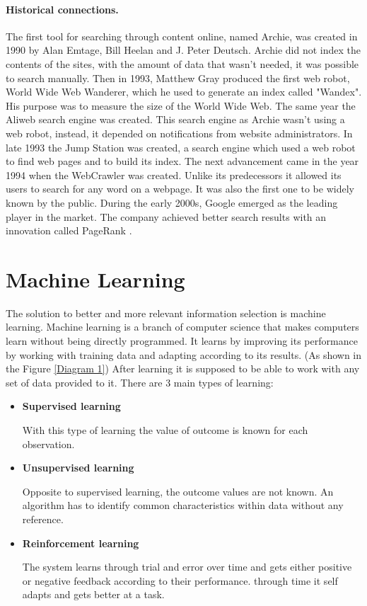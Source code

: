\documentclass[10pt,a4paper]{article}
\begin{document}
\paragraph{Historical connections.}
The first tool\cite{History} for searching through content online, named Archie, was created in 1990 by Alan Emtage, Bill Heelan and J. Peter Deutsch. Archie did not index the contents of the sites, with the amount of data that wasn't needed, it was possible to search manually. Then in 1993, Matthew Gray produced the first web robot, World Wide Web Wanderer, which he used to generate an index called "Wandex". His purpose was to measure the size of the World Wide Web. The same year the Aliweb search engine was created. This search engine as Archie wasn't using a web robot, instead, it depended on notifications from website administrators. 
In late 1993 the Jump Station was created, a search engine which used a web robot to find web pages and to build its index. The next advancement came in the year 1994 when the WebCrawler was created. Unlike its predecessors it allowed its users to search for any word on a webpage. It was also the first one to be widely known by the public. During the early 2000s, Google emerged as the leading player in the market. The company achieved better search results with an innovation called PageRank \cite{rogers2002google}.

\section{Machine Learning}
The solution to better and more relevant information selection is machine learning. Machine learning is a branch of computer science that makes computers learn without being directly programmed. It learns by improving its performance by working with training data and adapting according to its results. (As shown in the Figure \ref{Diagram 1}) After learning it is supposed to be able to work with any set of data provided to it. There are 3 main types of learning\cite{QGKL-ML}: 


\begin{itemize}
\item \textbf{Supervised learning} 

With this type of learning the value of outcome is known for each observation. 

\item \textbf{Unsupervised learning} 

Opposite to supervised learning, the outcome values are not known. An algorithm has to identify common characteristics within data without any reference.

\item \textbf{Reinforcement learning} 

The system learns through trial and error over time and gets either positive or negative feedback according to their performance. through time it self adapts and gets better at a task.
\end{itemize}
\end{document}
